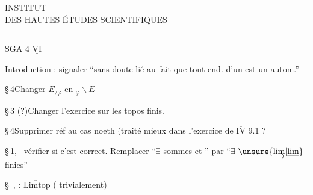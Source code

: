 \begin{center}
INSTITUT\\
DES HAUTES ÉTUDES SCIENTIFIQUES\\
\rule{2.3em}{0.4pt}
\end{center}
SGA 4 $\underline{\overline{\mathrm{VI}}}$

Introduction : signaler  ``sans doute lié au fait que tout end. d'un  est un autom.''\unsure{)|\}}

\S\,4\qquad Changer \(E_{/\varphi}\) en \({}_{\varphi}\backslash E\)

\S\,3 (?)\qquad Changer l'exercice sur les topos finis.

\S\,4\qquad Supprimer réf au cas noeth (traité mieux dans l'exercice de $\underline{\overline{\mathrm{IV}}}$ 9.1 ?

\S\,1,\textemdash\,- vérifier si c'est correct. Remplacer ``$\exists$ sommes  et ''  par ``$\exists$ $\unsure{\underrightarrow{\mathrm{lim}}|\underline{\mathrm{lim}}}$ finies''

\S\ ,\qquad {} : $\underrightarrow{\mathrm{Limtop}}$ ( trivialement)
